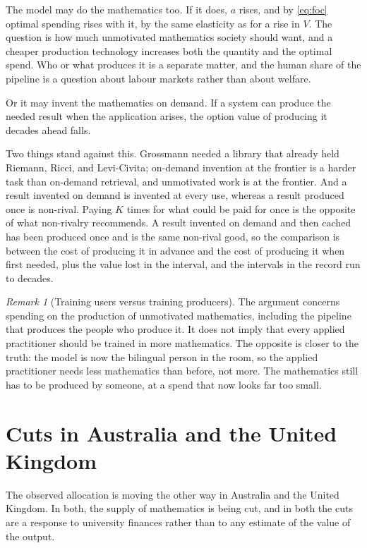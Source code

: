 \documentclass[11pt]{article}
\theoremstyle{definition}
\theoremstyle{remark}
\newtheorem{remark}{Remark}
\begin{document}
The model may do the mathematics too. If it does, $a$ rises, and by \eqref{eq:foc} optimal spending rises with it, by the same elasticity as for a rise in $V$. The question is how much unmotivated mathematics society should want, and a cheaper production technology increases both the quantity and the optimal spend. Who or what produces it is a separate matter, and the human share of the pipeline is a question about labour markets rather than about welfare.

Or it may invent the mathematics on demand. If a system can produce the needed result when the application arises, the option value of producing it decades ahead falls.

Two things stand against this. Grossmann needed a library that already held Riemann, Ricci, and Levi-Civita; on-demand invention at the frontier is a harder task than on-demand retrieval, and unmotivated work is at the frontier. And a result invented on demand is invented at every use, whereas a result produced once is non-rival. Paying $K$ times for what could be paid for once is the opposite of what non-rivalry recommends. A result invented on demand and then cached has been produced once and is the same non-rival good, so the comparison is between the cost of producing it in advance and the cost of producing it when first needed, plus the value lost in the interval, and the intervals in the record run to decades.

\begin{remark}[Training users versus training producers]
The argument concerns spending on the production of unmotivated mathematics, including the pipeline that produces the people who produce it. It does not imply that every applied practitioner should be trained in more mathematics. The opposite is closer to the truth: the model is now the bilingual person in the room, so the applied practitioner needs less mathematics than before, not more. The mathematics still has to be produced by someone, at a spend that now looks far too small.
\end{remark}

\section{Cuts in Australia and the United Kingdom}

The observed allocation is moving the other way in Australia and the United Kingdom. In both, the supply of mathematics is being cut, and in both the cuts are a response to university finances rather than to any estimate of the value of the output.
\end{document}
